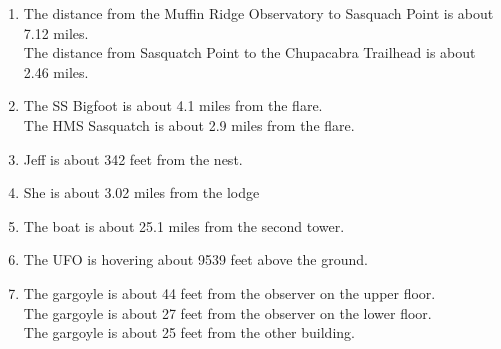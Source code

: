 \begin{enumerate}
\item The distance from the Muffin Ridge Observatory to Sasquach Point is about 7.12 miles.\\
The distance from Sasquatch Point to the Chupacabra Trailhead is about 2.46 miles.

\item  The SS Bigfoot is about 4.1 miles from the flare. \\
The HMS Sasquatch is about 2.9 miles from the flare.

\item  Jeff is about 342 feet from the nest.

\item  She is about 3.02 miles from the lodge

\item  The boat is about 25.1 miles from the second tower.

\item  The UFO is hovering about 9539 feet above the ground.

\item The gargoyle is about 44 feet from the observer on the upper floor. \\
The gargoyle is about 27 feet from the observer on the lower floor. \\
The gargoyle is about 25 feet from the other building.

\end{enumerate}

\closegraphsfile